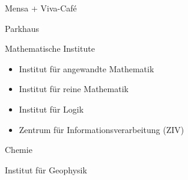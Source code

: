 {\vspace{\fill}
\begin{enumerate}[resume]
\begin{minipage}{8.2cm}
\item Mensa + Viva-Café
\item Parkhaus
\item Mathematische Institute
	\begin{itemize}[leftmargin=0.4cm]
	\item Institut für angewandte Mathematik
	\item Institut für reine Mathematik
	\item Institut für Logik
	\item Zentrum für Informationsverarbeitung (ZIV)
	\end{itemize}
\item Chemie
\item Institut für Geophysik
\end{minipage}
\end{enumerate}
}
